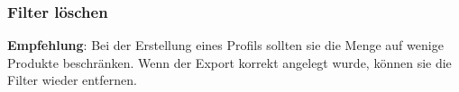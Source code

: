 \documentclass[a4paper,12pt]{book}
\begin{document}
\subsubsection{Filter löschen}
\label{sec:filter_delete}

\textbf{Empfehlung}: Bei der Erstellung eines Profils sollten sie die Menge auf
wenige Produkte beschränken. Wenn der Export korrekt angelegt wurde,
können sie die Filter wieder entfernen.
\end{document}
